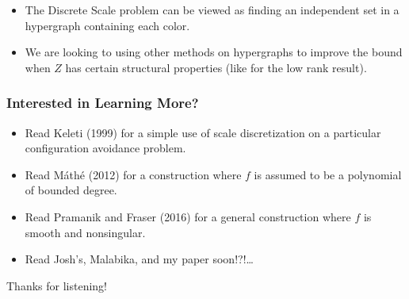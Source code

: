 \documentclass[usenames,dvipsnames]{beamer}
\begin{document}
\begin{frame}
\begin{figure}
\begin{subfigure}{.4\textwidth}
        \end{subfigure}
    \end{figure}

    \begin{itemize}
        \pause
        \pause
        \pause
        \pause
        \item The Discrete Scale problem can be viewed as finding an independent set in a hypergraph containing each color.

        \pause
        \item We are looking to using other methods on hypergraphs to improve the bound when $Z$ has certain structural properties (like for the low rank result).
    \end{itemize}
\end{frame}

\begin{frame}
    \frametitle{Interested in Learning More?}

    \begin{itemize}
            \item Read Keleti (1999) for a simple use of scale discretization on a particular configuration avoidance problem.
            \pause
            \item Read M\'{a}th\'{e} (2012) for a construction where $f$ is assumed to be a polynomial of bounded degree.
            \pause
            \item Read Pramanik and Fraser (2016) for a general construction where $f$ is smooth and nonsingular.

            \pause
            \item Read Josh's, Malabika, and my paper soon!?!\dots
    \end{itemize}

    \pause
    Thanks for listening!
\end{frame}
\end{document}
